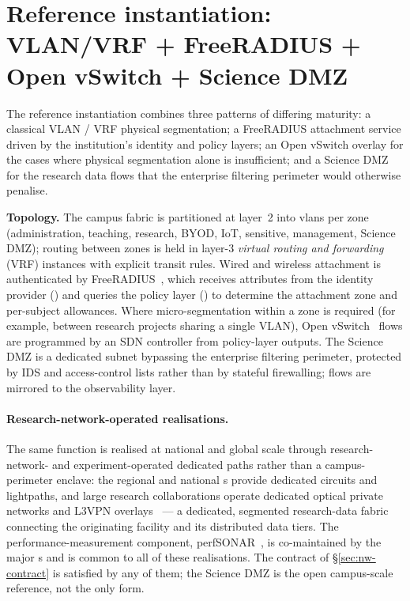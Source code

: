 \section{Reference instantiation: VLAN/VRF + FreeRADIUS + Open vSwitch + Science DMZ}
\label{sec:nw-reference}

The reference instantiation combines three patterns of differing
maturity: a classical VLAN / VRF physical segmentation; a FreeRADIUS
attachment service driven by the institution's identity and policy
layers; an Open vSwitch overlay for the cases where physical
segmentation alone is insufficient; and a Science DMZ for the
research data flows that the enterprise filtering perimeter would
otherwise penalise.

\begin{instantiationbox}
\noindent\textbf{Topology.} The campus fabric is partitioned at
layer~2 into \gls{vlan}s per zone (administration, teaching,
research, BYOD, IoT, sensitive, management, Science DMZ); routing
between zones is held in layer-3 \emph{virtual routing and
forwarding} (VRF) instances with explicit transit rules. Wired and
wireless attachment is authenticated by FreeRADIUS~\cite{freeradius}, which receives
attributes from the identity provider () and
queries the policy layer () to determine the
attachment zone and per-subject allowances. Where micro-segmentation
within a zone is required (for example, between research projects
sharing a single VLAN), Open vSwitch~\cite{openvswitch} flows are programmed by an SDN
controller from policy-layer outputs. The Science DMZ is a
dedicated subnet bypassing the enterprise filtering perimeter,
protected by IDS and access-control lists rather than by stateful
firewalling; flows are mirrored to the observability layer.
\end{instantiationbox}

\paragraph{Research-network-operated realisations.} The same function
is realised at national and global scale through research-network- and
experiment-operated dedicated paths rather than a campus-perimeter
enclave: the regional and national s
provide dedicated circuits and lightpaths, and large research
collaborations operate dedicated optical private networks and L3VPN
overlays~\cite{cern-lhcone, cern-wlcg} --- a dedicated, segmented
research-data fabric connecting the originating facility and its
distributed data tiers. The performance-measurement component,
perfSONAR~\cite{perfsonar}, is co-maintained by the major
s and is common to all of these realisations. The
contract of \S\ref{sec:nw-contract} is satisfied by any of them; the
Science DMZ is the open campus-scale reference, not the only form.

